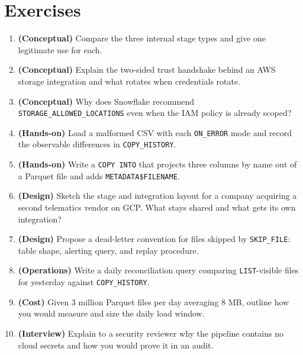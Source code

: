 \section{Exercises}
\begin{enumerate}
    \item \textbf{(Conceptual)} Compare the three internal stage types and give one legitimate use for each.
    \item \textbf{(Conceptual)} Explain the two-sided trust handshake behind an AWS storage integration and what rotates when credentials rotate.
    \item \textbf{(Conceptual)} Why does Snowflake recommend \texttt{STORAGE\_ALLOWED\_LOCATIONS} even when the IAM policy is already scoped?
    \item \textbf{(Hands-on)} Load a malformed CSV with each \texttt{ON\_ERROR} mode and record the observable differences in \texttt{COPY\_HISTORY}.
    \item \textbf{(Hands-on)} Write a \texttt{COPY INTO} that projects three columns by name out of a Parquet file and adds \texttt{METADATA\$FILENAME}.
    \item \textbf{(Design)} Sketch the stage and integration layout for a company acquiring a second telematics vendor on GCP. What stays shared and what gets its own integration?
    \item \textbf{(Design)} Propose a dead-letter convention for files skipped by \texttt{SKIP\_FILE}: table shape, alerting query, and replay procedure.
    \item \textbf{(Operations)} Write a daily reconciliation query comparing \texttt{LIST}-visible files for yesterday against \texttt{COPY\_HISTORY}.
    \item \textbf{(Cost)} Given 3 million Parquet files per day averaging 8 MB, outline how you would measure and size the daily load window.
    \item \textbf{(Interview)} Explain to a security reviewer why the pipeline contains no cloud secrets and how you would prove it in an audit.
\end{enumerate}

